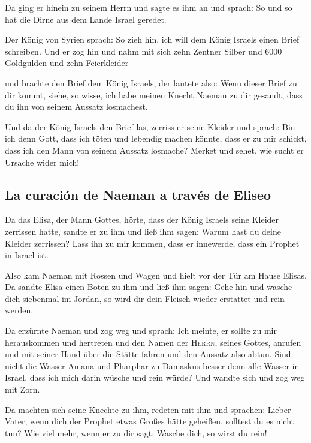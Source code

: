  Da ging er hinein zu seinem Herrn und sagte es ihm an und
sprach: So und so hat die Dirne aus dem Lande Israel geredet.

 Der König von Syrien sprach: So zieh hin, ich will dem
König Israels einen Brief schreiben. Und er zog hin und nahm mit sich
zehn Zentner Silber und 6000 Goldgulden und zehn Feierkleider

 und brachte den Brief dem König Israels, der lautete
also: Wenn dieser Brief zu dir kommt, siehe, so wisse, ich habe meinen
Knecht Naeman zu dir gesandt, dass du ihn von seinem Aussatz losmachest.

 Und da der König Israels den Brief las, zerriss er seine
Kleider und sprach: Bin ich denn Gott, dass ich töten und lebendig
machen könnte, dass er zu mir schickt, dass ich den Mann von seinem
Aussatz losmache? Merket und sehet, wie sucht er Ursache wider mich!

\hypertarget{la-curaciuxf3n-de-naeman-a-travuxe9s-de-eliseo}{%
\subsection{La curación de Naeman a través de
Eliseo}\label{la-curaciuxf3n-de-naeman-a-travuxe9s-de-eliseo}}

 Da das Elisa, der Mann Gottes, hörte, dass der König
Israels seine Kleider zerrissen hatte, sandte er zu ihm und ließ ihm
sagen: Warum hast du deine Kleider zerrissen? Lass ihn zu mir kommen,
dass er innewerde, dass ein Prophet in Israel ist.

 Also kam Naeman mit Rossen und Wagen und hielt vor der
Tür am Hause Elisas.  Da sandte Elisa einen Boten zu ihm
und ließ ihm sagen: Gehe hin und wasche dich siebenmal im Jordan, so
wird dir dein Fleisch wieder erstattet und rein werden.

 Da erzürnte Naeman und zog weg und sprach: Ich meinte,
er sollte zu mir herauskommen und hertreten und den Namen der
\textsc{Herrn}, seines Gottes, anrufen und mit seiner Hand über die
Stätte fahren und den Aussatz also abtun.  Sind nicht die
Wasser Amana und Pharphar zu Damaskus besser denn alle Wasser in Israel,
dass ich mich darin wüsche und rein würde? Und wandte sich und zog weg
mit Zorn.

 Da machten sich seine Knechte zu ihm, redeten mit ihm
und sprachen: Lieber Vater, wenn dich der Prophet etwas Großes hätte
geheißen, solltest du es nicht tun? Wie viel mehr, wenn er zu dir sagt:
Wasche dich, so wirst du rein!

